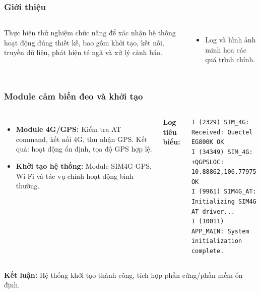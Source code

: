 
\begin{frame}[t]
\frametitle{Giới thiệu}
\begin{columns}[T]
    Thực hiện thử nghiệm chức năng để xác nhận hệ thống hoạt động đúng thiết kế, bao gồm khởi tạo, kết nối, truyền dữ liệu, phát hiện té ngã và xử lý cảnh báo.
    \begin{itemize}
        \item Log và hình ảnh minh họa các quá trình chính.
    \end{itemize}
\end{columns}
\end{frame}

\begin{frame}[t,fragile]
\frametitle{Module cảm biến đeo và khởi tạo}
\begin{columns}[T]
    \begin{itemize}
        \item \textbf{Module 4G/GPS:} Kiểm tra AT command, kết nối 4G, thu nhận GPS. Kết quả: hoạt động ổn định, tọa độ GPS hợp lệ.
        \item \textbf{Khởi tạo hệ thống:} Module SIM4G-GPS, Wi-Fi và tác vụ chính hoạt động bình thường.
    \end{itemize}
    \textbf{Log tiêu biểu:}
    \begin{verbatim}
I (2329) SIM_4G: Received: Quectel EG800K OK
I (34349) SIM_4G: +QGPSLOC: 10.88862,106.77975 OK
I (9961) SIM4G_AT: Initializing SIM4G AT driver...
I (10011) APP_MAIN: System initialization complete.
    \end{verbatim}
\end{columns}
\vspace{0.2cm}
\textbf{Kết luận:} Hệ thống khởi tạo thành công, tích hợp phần cứng/phần mềm ổn định.
\end{frame}

